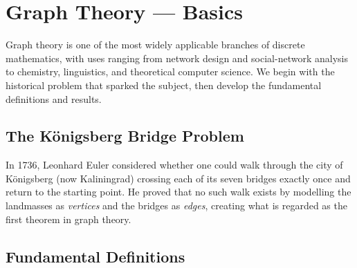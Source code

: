 \documentclass[12pt,a4paper,openany]{book}
\theoremstyle{definition}
\theoremstyle{plain}
\theoremstyle{remark}
\begin{document}
\newpage

\chapter{Graph Theory --- Basics}\label{ch:graphs}

Graph theory is one of the most widely applicable branches of discrete
mathematics, with uses ranging from network design and social-network
analysis to chemistry, linguistics, and theoretical computer science.
We begin with the historical problem that sparked the subject, then
develop the fundamental definitions and results.

\section{The K\"onigsberg Bridge Problem}\label{sec:konigsberg}

In 1736, Leonhard Euler considered whether one
could walk through the city of K\"onigsberg (now Kaliningrad) crossing
each of its seven bridges exactly once and return to the starting point.
He proved that no such walk exists by modelling the landmasses as
\emph{vertices} and the bridges as \emph{edges}, creating what is
regarded as the first theorem in graph theory.

\begin{center}
\end{center}

\section{Fundamental Definitions}\label{sec:graph-def}
\end{document}
